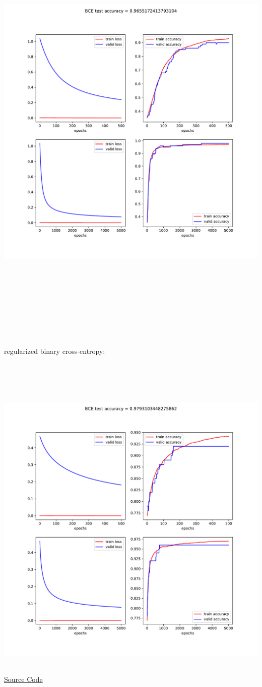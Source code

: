 \documentclass[17pt]{report}
\begin{document}
\includegraphics[width=15cm, height=15cm]{BCE}\\\\\\\\\\\\\\\\
regularized binary cross-entropy:\\\\\\\\
\includegraphics[width=15cm, height=15cm]{RBCE}\\
\href{https://github.com/zamaniali1995/notMNIST-with-TensorFlow-with-two-class-C-and-J}{Source Code}
\end{document}

